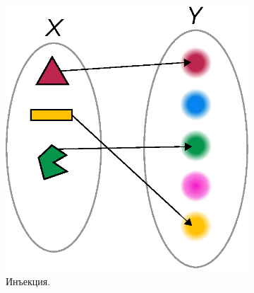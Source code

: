 \documentclass[a4paper,12pt]{article}
\begin{document}
  \begin{figure}[h]
    \centering
    
    \begin{subfigure}[b]{0.3\textwidth}
      \centering
    
      \includegraphics[width=\columnwidth]{injection}
    
      \caption{Инъекция.}
      \label{fig:injection}
    \end{subfigure}
    \hspace{2em}
    \begin{subfigure}[b]{0.3\textwidth}
      

\end{subfigure}
\end{figure}
\end{document}
